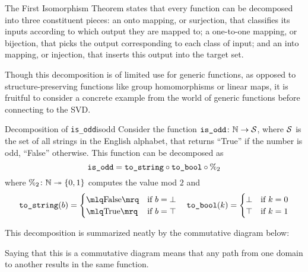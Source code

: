 \documentclass[../../thesis.tex]{subfiles}
\begin{document}
The First Isomorphism Theorem states that every function can be decomposed
into three constituent pieces:
an onto mapping, or surjection,
that classifies its inputs according to which output they are mapped to;
a one-to-one mapping, or bijection,
that picks the output corresponding to each class of input;
and an into mapping, or injection,
that inserts this output into the target set.

Though this decomposition is of limited use
for generic functions,
as opposed to structure-preserving functions
like group homomorphisms
or linear maps,
it is fruitful to consider a concrete example
from the world of generic functions
before connecting to the SVD.\@

\begin{example}{Decomposition of \texttt{is\_odd}}{isodd}
	Consider the function $\texttt{is\_odd}\colon \mathbb{N} \to {\mathcal{S}}$,
	where ${\mathcal{S}}$ is the set of all strings in the English alphabet,
	that returns \enquote{True} if the number is odd,
	\enquote{False} otherwise.
	This function can be decomposed as
	\begin{equation}
		\texttt{is\_odd} =
		\texttt{to\_string} \circ \texttt{to\_bool} \circ {\%}_2
	\end{equation}
	where $\%_2\colon\mathbb{N} \twoheadrightarrow \left\{0, 1\right\}$
	computes the value mod $2$ and
	\begin{equation*}
		\texttt{to\_string}(b) = %
			\begin{cases}
				\mlq \text{False} \mrq & \text{if } b = \bot \\
				\mlq \text{True} \mrq & \text{if } b = \top
			\end{cases} \quad
		\texttt{to\_bool}(k) = %
			\begin{cases}
			     \bot  & 	\text{if } k = 0 \\
			     \top  & 	\text{if } k = 1
			\end{cases}
	\end{equation*}
\end{example}

This decomposition is summarized neatly by the commutative diagram below:
\begin{center}
\end{center}
Saying that this is a commutative diagram
means that any path from one domain to another
results in the same function.
\end{document}
